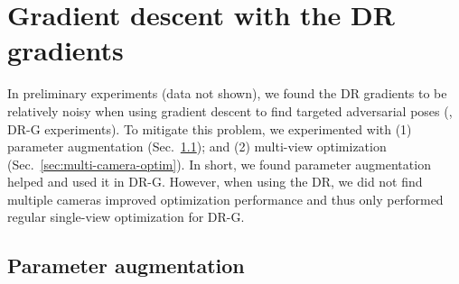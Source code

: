 \documentclass[10pt,twocolumn,letterpaper]{article}
\newcommand{\subsec}[1]{\noindent{\textbf{#1.}}}
\begin{document}
%

\section{Gradient descent with the DR gradients}\label{sec:kr}

In preliminary experiments (data not shown), we found the DR gradients to be relatively noisy when using gradient descent to find targeted adversarial poses (\ie, DR-G experiments).
To mitigate this problem, we experimented with (1) parameter augmentation (Sec.~\ref{sec:param-augm}); and (2) multi-view optimization (Sec.~\ref{sec:multi-camera-optim}).
In short, we found parameter augmentation helped and used it in DR-G.
However, when using the DR, we did not find multiple cameras improved optimization performance and thus only performed regular single-view optimization for DR-G.

\subsection{Parameter augmentation}%
\label{sec:param-augm}
\end{document}
